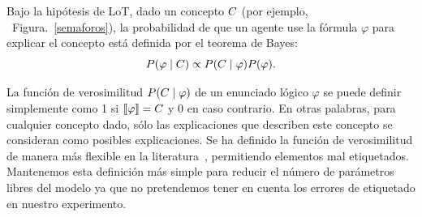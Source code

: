 \newcommand{\form}{\varphi}
Bajo la hipótesis de LoT,  dado un concepto $C$ (por ejemplo, \ Figura.~\ref{semaforos}), la probabilidad de que un agente use la fórmula $\form$ para explicar el concepto está definida por el teorema de Bayes: 
$$
P(\form\mid \con) \propto P(\con\mid \form)P(\form).
\label{Bayes fix}
$$
%

La función de verosimilitud $P(\con\mid \form)$ de un enunciado lógico $\form$ se puede definir simplemente como 1 si $\sem{\form}=\con$ y 0 en caso contrario. En otras palabras, para cualquier concepto dado, sólo las explicaciones que describen este concepto se consideran como posibles explicaciones. Se ha definido la función de verosimilitud de manera más flexible en la literatura~\cite{goodman2008rational,piantadosi2016logical}, permitiendo elementos mal etiquetados. Mantenemos esta definición más simple para reducir el número de parámetros libres del modelo ya que no pretendemos tener en cuenta los errores de etiquetado en nuestro experimento. 


